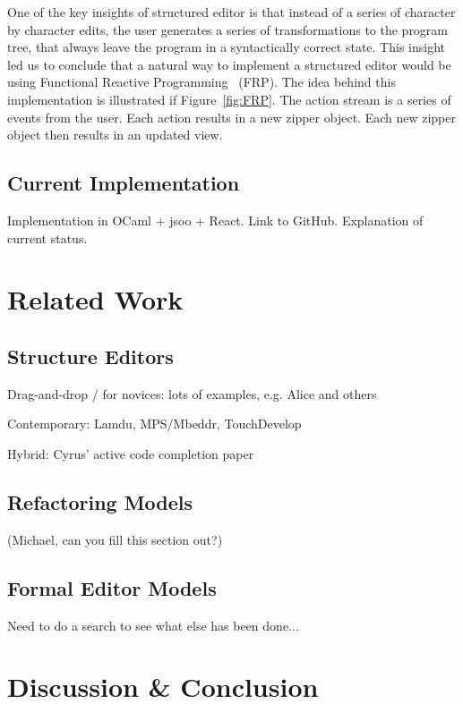 \documentclass{llncs}
\begin{document}
One of the key insights of structured editor is that instead of a series of character by character edits, the user generates a series of transformations to the program tree, that always leave the program in a syntactically correct state.  This insight led us to conclude that a natural way to implement a structured editor would be using 
Functional Reactive Programming~\cite{Wan:2000:FRP:349299.349331} (FRP). 
The idea behind this implementation is illustrated if Figure~\ref{fig:FRP}.  The action stream is a series of events from the user.  
Each action results in a new zipper object.  Each new zipper object then results in an updated view.



\subsection{Current Implementation}

Implementation in OCaml + jsoo + React. Link to GitHub. Explanation of current status.






\section{Related Work}
\subsection{Structure Editors}
Drag-and-drop / for novices: lots of examples, e.g. Alice and others

Contemporary: Lamdu, MPS/Mbeddr, TouchDevelop

Hybrid: Cyrus' active code completion paper

\subsection{Refactoring Models}
(Michael, can you fill this section out?)

\subsection{Formal Editor Models}
Need to do a search to see what else has been done...

\section{Discussion \& Conclusion}
\end{document}
